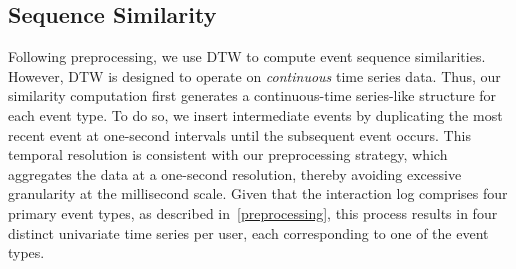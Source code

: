 \documentclass[preprint,journal]{vgtc}            %
\begin{document}



\subsection{Sequence Similarity}
\label{sec:seq_similaity}

Following preprocessing, we use DTW to compute event sequence similarities.
However, DTW is designed to operate on \textit{continuous} time series data.
Thus, our similarity computation first generates a continuous-time series-like structure for each event type. 
To do so, we insert intermediate events by duplicating the most recent event at one-second intervals until the subsequent event occurs.
This temporal resolution is consistent with our preprocessing strategy, which aggregates the data at a one-second resolution, thereby avoiding excessive granularity at the millisecond scale.
Given that the interaction log comprises four primary event types, as described in~\cref{preprocessing}, this process results in four distinct univariate time series per user, each corresponding to one of the event types.
\end{document}
